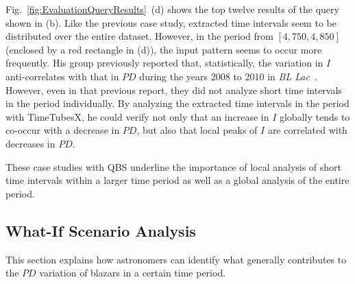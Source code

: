Fig.~\ref{fig:EvaluationQueryResults}~(d) shows the top twelve results of the query shown in (b).
Like the previous case study, 
extracted time intervals seem to be distributed over the entire dataset. %
However, in the period from $[4{,}750, 4{,}850]$ (enclosed by a red rectangle in (d)), 
the input pattern seems to occur more frequently.
His group previously reported that, statistically, the variation in $I$ anti-correlates with that in $PD$ during the years 2008 to 2010 in \emph{BL Lac}~\cite{Gaur2014}.
However, even in that previous report, they did not analyze short time intervals in the period individually.
By analyzing the extracted time intervals in the period with TimeTubesX, he could verify not only that an increase in $I$ globally tends to co-occur with a decrease in $PD$, 
but also that local peaks of $I$ are correlated with decreases in $PD$.

These case studies with QBS underline the importance of local analysis of short time intervals within a larger time period as well as a global analysis of the entire period.

%
%
\subsection{What-If Scenario Analysis}\label{sec:whatif}
This section explains how astronomers can identify what generally contributes to the $PD$ variation of blazars in a certain time period. 

